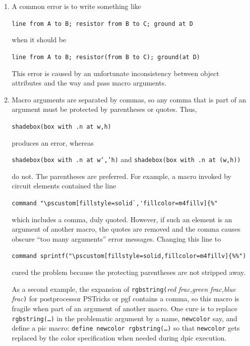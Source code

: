 \begin{enumerate}
\noindent because {\tt rp\_ang} is not defined in the outermost scope of the
diagram.  To cure this problem, make sure that the line

{\tt cct\_init}

\noindent appears immediately after the .PS line or prior to the first block.
It is entirely permissible to modify {\tt cct\_init} to include customized
diagram initializations such as the {\tt thicklines\_} statement.
One way to do this is to define a macro {\tt local\_init} in
{\tt libgen.m4}.
\fi

\item
{}%
  A common error is to write something like

{\tt line from A to B; resistor from B to C; ground at D}

\noindent when it should be

{\tt line from A to B; resistor(from B to C); ground(at D)}

\noindent This error is caused by an unfortunate inconsistency between
\pic object attributes and the way \Mfour and \pic pass macro arguments.

\item 
{}
Macro arguments are separated by commas, so any comma that is
part of an argument must be protected by parentheses or quotes.  Thus,

{\tt shadebox(box with .n at w,h)}

\noindent produces an error, whereas

{\tt shadebox(box with .n at w`,'h)} and
{\tt shadebox(box with .n at (w,h))}

\noindent do not. The parentheses are preferred.
For example, a macro invoked by circuit elements contained the line

\verb|command "\pscustom[fillstyle=solid`,'fillcolor=m4fillv]{%"|

\noindent which includes a comma, duly quoted.  However, if such an
element is an argument of another macro, the quotes are removed and the
comma causes obscure ``too many arguments'' error messages.
Changing this line to

\verb|command sprintf("\pscustom[fillstyle=solid,fillcolor=m4fillv]{%%")|

\noindent
cured the problem because the protecting parentheses are not stripped away.

As a second example, the expansion of
{\tt rgbstring(}{\sl red frac,green frac,blue frac}{\tt )}
for postprocessor PSTricks or pgf contains a comma, so this macro is fragile
when part of an argument of another macro.  One cure is to
replace {\tt rgbstring(\ldots)} in the problematic argument
by a name, {\tt newcolor} say, and define a pic macro:
{\tt define newcolor \lbr{}rgbstring(\ldots)\rbr}
so that {\tt newcolor} gets replaced by the color specification
when needed during dpic execution.


\end{enumerate}
